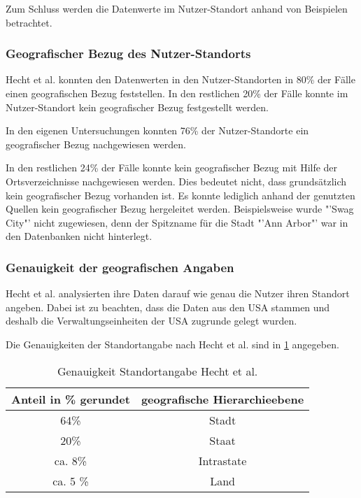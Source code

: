 				Zum Schluss werden die Datenwerte im Nutzer-Standort anhand von Beispielen betrachtet.

			\subsubsection{Geografischer Bezug des Nutzer-Standorts} 
				
				Hecht et al. konnten den Datenwerten in den Nutzer-Standorten in 80\% der Fälle einen geografischen Bezug feststellen.
				In den restlichen 20\% der Fälle konnte im Nutzer-Standort kein geografischer Bezug festgestellt werden. 

				In den eigenen Untersuchungen konnten 76\% der Nutzer-Standorte ein geografischer Bezug nachgewiesen werden. 

				In den restlichen 24\% der Fälle konnte kein geografischer Bezug mit Hilfe der Ortsverzeichnisse nachgewiesen werden. 
				Dies bedeutet nicht, dass grundsätzlich kein geografischer Bezug vorhanden ist. 
				Es konnte lediglich anhand der genutzten Quellen kein geografischer Bezug hergeleitet werden.
				Beispielsweise wurde "'Swag City"' nicht zugewiesen, denn der Spitzname für die Stadt "'Ann Arbor"' war in den Datenbanken nicht hinterlegt. 
				
			\subsubsection{Genauigkeit der geografischen Angaben}
				
				Hecht et al. analysierten ihre Daten darauf wie genau die Nutzer ihren Standort angeben.
				Dabei ist zu beachten, dass die Daten aus den USA stammen und deshalb die Verwaltungseinheiten der USA zugrunde gelegt wurden.
				
				Die Genauigkeiten der Standortangabe nach Hecht et al. sind in \ref{tab:genauigkeitenHecht} angegeben. 

				\begin{table}[htpb]
				\caption{Genauigkeit Standortangabe Hecht et al.} 
				\centering
				\begin{tabular}{|c||c|}
					\hline
					Anteil in \% gerundet & geografische Hierarchieebene \\
					\hline\hline
					64\% & Stadt \\
					\hline
					20\% & Staat \\
					\hline
					ca. 8\% & Intrastate \\
					\hline
					ca. 5 \% & Land \\
					\hline
				\end{tabular}
				\label{tab:genauigkeitenHecht} 
				\end{table} 


